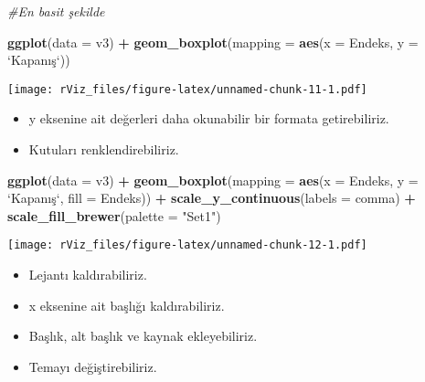 \documentclass[
]{book}
\newenvironment{Shaded}{\begin{snugshade}}{\end{snugshade}}
\newcommand{\CommentTok}[1]{\textcolor[rgb]{0.56,0.35,0.01}{\textit{#1}}}
\newcommand{\DataTypeTok}[1]{\textcolor[rgb]{0.13,0.29,0.53}{#1}}
\newcommand{\KeywordTok}[1]{\textcolor[rgb]{0.13,0.29,0.53}{\textbf{#1}}}
\newcommand{\NormalTok}[1]{#1}
\newcommand{\OperatorTok}[1]{\textcolor[rgb]{0.81,0.36,0.00}{\textbf{#1}}}
\newcommand{\StringTok}[1]{\textcolor[rgb]{0.31,0.60,0.02}{#1}}
\begin{document}
\begin{Shaded}
\begin{Highlighting}[]
\CommentTok{#En basit şekilde}

\KeywordTok{ggplot}\NormalTok{(}\DataTypeTok{data =}\NormalTok{ v3) }\OperatorTok{+}
\StringTok{  }\KeywordTok{geom_boxplot}\NormalTok{(}\DataTypeTok{mapping =} \KeywordTok{aes}\NormalTok{(}\DataTypeTok{x =}\NormalTok{ Endeks, }\DataTypeTok{y =} \StringTok{`}\DataTypeTok{Kapanış}\StringTok{`}\NormalTok{))}
\end{Highlighting}
\end{Shaded}

\texttt{[image: rViz\_files/figure-latex/unnamed-chunk-11-1.pdf]}

\begin{itemize}
\item
  y eksenine ait değerleri daha okunabilir bir formata getirebiliriz.
\item
  Kutuları renklendirebiliriz.
\end{itemize}

\begin{Shaded}
\begin{Highlighting}[]
\KeywordTok{ggplot}\NormalTok{(}\DataTypeTok{data =}\NormalTok{ v3) }\OperatorTok{+}
\StringTok{  }\KeywordTok{geom_boxplot}\NormalTok{(}\DataTypeTok{mapping =} \KeywordTok{aes}\NormalTok{(}\DataTypeTok{x =}\NormalTok{ Endeks, }\DataTypeTok{y =} \StringTok{`}\DataTypeTok{Kapanış}\StringTok{`}\NormalTok{, }\DataTypeTok{fill =}\NormalTok{ Endeks)) }\OperatorTok{+}
\StringTok{  }\KeywordTok{scale_y_continuous}\NormalTok{(}\DataTypeTok{labels =}\NormalTok{ comma) }\OperatorTok{+}
\StringTok{  }\KeywordTok{scale_fill_brewer}\NormalTok{(}\DataTypeTok{palette =} \StringTok{"Set1"}\NormalTok{)}
\end{Highlighting}
\end{Shaded}

\texttt{[image: rViz\_files/figure-latex/unnamed-chunk-12-1.pdf]}

\begin{itemize}
\item
  Lejantı kaldırabiliriz.
\item
  x eksenine ait başlığı kaldırabiliriz.
\item
  Başlık, alt başlık ve kaynak ekleyebiliriz.
\item
  Temayı değiştirebiliriz.
\end{itemize}
\end{document}
